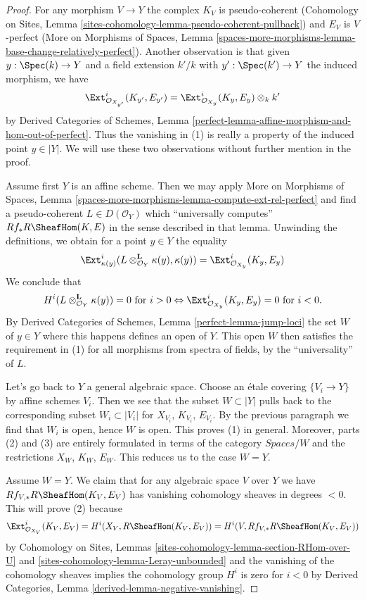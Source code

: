 \begin{proof}
For any morphism $V \to Y$ the complex $K_V$ is pseudo-coherent
(Cohomology on Sites, Lemma
\ref{sites-cohomology-lemma-pseudo-coherent-pullback})
and $E_V$ is $V$-perfect (More on Morphisms of Spaces, Lemma
\ref{spaces-more-morphisms-lemma-base-change-relatively-perfect}).
Another observation is that given $y : \Spec(k) \to Y$
and a field extension $k'/k$ with $y' : \Spec(k') \to Y$
the induced morphism, we have
$$
\Ext^i_{\mathcal{O}_{X_{y'}}}(K_{y'}, E_{y'}) =
\Ext^i_{\mathcal{O}_{X_y}}(K_y, E_y) \otimes_k k'
$$
by Derived Categories of Schemes, Lemma
\ref{perfect-lemma-affine-morphism-and-hom-out-of-perfect}.
Thus the vanishing in (1) is really a property of the induced
point $y \in |Y|$.
We will use these two observations without further mention in the proof.

\medskip\noindent
Assume first $Y$ is an affine scheme. Then we may apply
More on Morphisms of Spaces, Lemma
\ref{spaces-more-morphisms-lemma-compute-ext-rel-perfect}
and find a pseudo-coherent $L \in D(\mathcal{O}_Y)$ which
``universally computes'' $Rf_*R\SheafHom(K, E)$ in the sense
described in that lemma. Unwinding the definitions, we obtain
for a point $y \in Y$ the equality
$$
\Ext^i_{\kappa(y)}(L \otimes_{\mathcal{O}_Y}^\mathbf{L} \kappa(y),
\kappa(y)) = \Ext^i_{\mathcal{O}_{X_y}}(K_y, E_y)
$$
We conclude that
$$
H^i(L \otimes_{\mathcal{O}_Y}^\mathbf{L} \kappa(y)) = 0
\text{ for } i > 0 \Leftrightarrow
\Ext^i_{\mathcal{O}_{X_y}}(K_y, E_y) = 0 \text{ for }i < 0.
$$
By Derived Categories of Schemes, Lemma \ref{perfect-lemma-jump-loci}
the set $W$ of $y \in Y$ where this happens defines an open of $Y$.
This open $W$ then satisfies the requirement in (1) for all morphisms
from spectra of fields, by the ``universality'' of $L$.

\medskip\noindent
Let's go back to $Y$ a general algebraic space.
Choose an \'etale covering $\{V_i \to Y\}$ by affine schemes $V_i$.
Then we see that the subset $W \subset |Y|$ pulls back to the corresponding
subset $W_i \subset |V_i|$ for $X_{V_i}$, $K_{V_i}$, $E_{V_i}$.
By the previous paragraph we find that $W_i$ is open, hence $W$ is open.
This proves (1) in general. Moreover, parts (2) and (3) are entirely formulated
in terms of the category $\textit{Spaces}/W$ and the restrictions
$X_W$, $K_W$, $E_W$. This reduces us to the case $W = Y$.

\medskip\noindent
Assume $W = Y$. We claim that for any algebraic space $V$ over $Y$
we have $Rf_{V, *}R\SheafHom(K_V, E_V)$ has vanishing cohomology
sheaves in degrees $< 0$. This will prove (2) because
$$
\Ext^i_{\mathcal{O}_{X_V}}(K_V, E_V) =
H^i(X_V, R\SheafHom(K_V, E_V)) = 
H^i(V, Rf_{V, *}R\SheafHom(K_V, E_V))
$$
by Cohomology on Sites, Lemmas
\ref{sites-cohomology-lemma-section-RHom-over-U} and
\ref{sites-cohomology-lemma-Leray-unbounded}
and the vanishing of the cohomology sheaves implies the
cohomology group $H^i$ is zero for $i < 0$ by
Derived Categories, Lemma \ref{derived-lemma-negative-vanishing}.


\end{proof}
